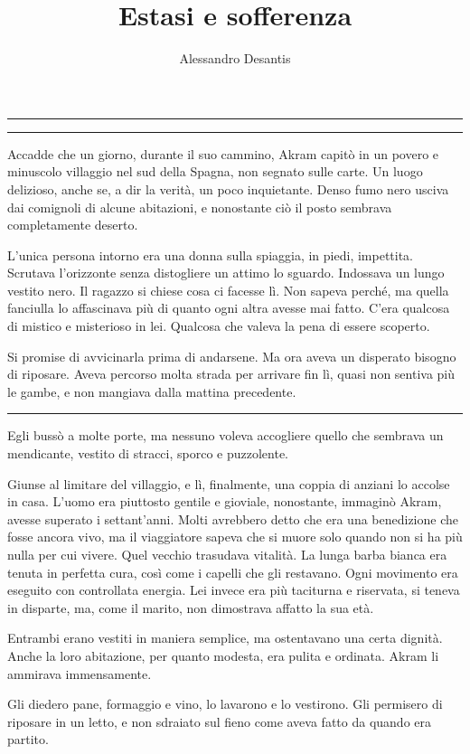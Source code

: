 \documentclass[a4paper,11pt,oneside,openright,final]{memoir}
\title{Estasi e sofferenza}
\author{Alessandro Desantis}
\makeatletter
\renewcommand{\maketitle}{\begin{titlingpage}%
    \let\footnotesize\small
    \let\footnoterule\relax
    \parindent \z@
    \reset@font
    \null\vfil
    \begin{flushleft}
      \huge \@title
    \end{flushleft}
    \par
    \hrule height 1pt
    \par
    \begin{flushright}
      \LARGE \@author \par
    \end{flushright}
    \vskip 60\p@
    \vfil\null
  \end{titlingpage}%
  \setcounter{footnote}{0}%
}
\makeatother
\begin{document}
\pagestyle{plain}

\maketitle

\plainbreak{1}

Accadde che un giorno, durante il suo cammino, Akram capitò in un povero e
minuscolo villaggio nel sud della Spagna, non segnato sulle carte. Un luogo
delizioso, anche se, a dir la verità, un poco inquietante. Denso fumo nero
usciva dai comignoli di alcune abitazioni, e nonostante ciò il posto sembrava
completamente deserto.

L'unica persona intorno era una donna sulla spiaggia, in piedi, impettita.
Scrutava l'orizzonte senza distogliere un attimo lo sguardo. Indossava un lungo
vestito nero. Il ragazzo si chiese cosa ci facesse lì. Non sapeva perché, ma
quella fanciulla lo affascinava più di quanto ogni altra avesse mai fatto.
C'era qualcosa di mistico e misterioso in lei. Qualcosa che valeva la pena di
essere scoperto.

Si promise di avvicinarla prima di andarsene. Ma ora aveva un disperato bisogno
di riposare. Aveva percorso molta strada per arrivare fin lì, quasi non sentiva
più le gambe, e non mangiava dalla mattina precedente.

\plainbreak{1}

Egli bussò a molte porte, ma nessuno voleva accogliere quello che sembrava un
mendicante, vestito di stracci, sporco e puzzolente.

Giunse al limitare del villaggio, e lì, finalmente, una coppia di anziani lo
accolse in casa. L'uomo era piuttosto gentile e gioviale, nonostante, immaginò
Akram, avesse superato i settant'anni. Molti avrebbero detto che era una
benedizione che fosse ancora vivo, ma il viaggiatore sapeva che si muore solo
quando non si ha più nulla per cui vivere. Quel vecchio trasudava vitalità. La
lunga barba bianca era tenuta in perfetta cura, così come i capelli che gli
restavano. Ogni movimento era eseguito con controllata energia. Lei invece era
più taciturna e riservata, si teneva in disparte, ma, come il marito, non
dimostrava affatto la sua età.

Entrambi erano vestiti in maniera semplice, ma ostentavano una certa dignità.
Anche la loro abitazione, per quanto modesta, era pulita e ordinata. Akram li
ammirava immensamente.

Gli diedero pane, formaggio e vino, lo lavarono e lo vestirono. Gli permisero di
riposare in un letto, e non sdraiato sul fieno come aveva fatto da quando era
partito.
\end{document}
